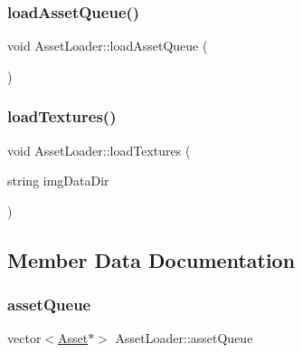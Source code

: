 \hypertarget{class_asset_loader_a20c0aca89038b89980be63b7639c89ff}{}\label{class_asset_loader_a20c0aca89038b89980be63b7639c89ff} 
\subsubsection{\texorpdfstring{load\+Asset\+Queue()}{loadAssetQueue()}}
{\footnotesize\ttfamily void Asset\+Loader\+::load\+Asset\+Queue (\begin{DoxyParamCaption}{ }\end{DoxyParamCaption})}

\hypertarget{class_asset_loader_ad5e2c8b9ad7ce00249f9ff5404d7363c}{}\label{class_asset_loader_ad5e2c8b9ad7ce00249f9ff5404d7363c} 
\subsubsection{\texorpdfstring{load\+Textures()}{loadTextures()}}
{\footnotesize\ttfamily void Asset\+Loader\+::load\+Textures (\begin{DoxyParamCaption}\item[{string}]{img\+Data\+Dir }\end{DoxyParamCaption})}



\subsection{Member Data Documentation}
\hypertarget{class_asset_loader_a9b8deb026e3b796b37c99cb1253d7868}{}\label{class_asset_loader_a9b8deb026e3b796b37c99cb1253d7868} 
\subsubsection{\texorpdfstring{asset\+Queue}{assetQueue}}
{\footnotesize\ttfamily vector$<$\hyperlink{struct_asset}{Asset}$\ast$$>$ Asset\+Loader\+::asset\+Queue\hspace{0.3cm}{\ttfamily [protected]}}

\hypertarget{class_asset_loader_a1420f613835a3aa5ca97affb12b31da8}{}\label{class_asset_loader_a1420f613835a3aa5ca97affb12b31da8} 
